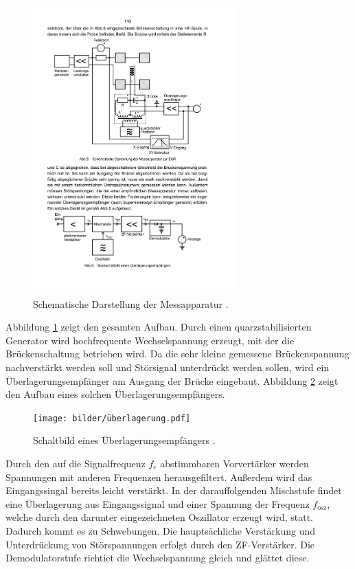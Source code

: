 \begin{figure}
	\centering
  \includegraphics[width=0.7\textwidth] {bilder/aufbau2.pdf}
	\caption{Schematische Darstellung der Messapparatur \cite{anleitung28}.}
	\label{fig:aufbau2}
\end{figure}

Abbildung \ref{fig:aufbau2} zeigt den gesamten Aufbau. Durch einen quarzstabilisierten Generator wird hochfrequente Wechselspannung erzeugt, mit der die Brückenschaltung betrieben wird. Da die sehr kleine gemessene Brückenspannung nachverstärkt werden soll und Störsignal unterdrückt werden sollen, wird ein Überlagerungsempfänger am Ausgang der Brücke eingebaut. Abbildung \ref{fig:ueberlagerung} zeigt den Aufbau eines solchen Überlagerungsempfängers.
\begin{figure}
	\centering
  \texttt{[image: bilder/überlagerung.pdf]}
	\caption{Schaltbild eines Überlagerungsempfängers \cite{anleitung28}.}
	\label{fig:ueberlagerung}
\end{figure}
Durch den auf die Signalfrequenz $f_e$ abstimmbaren Vorvertärker werden Spannungen mit anderen Frequenzen herausgefiltert. Außerdem wird das Eingangssingal bereits leicht verstärkt. In der darauffolgenden Mischstufe findet eine Überlagerung aus Eingangssignal und einer Spannung der Frequenz $f_\mathrm{osz}$, welche durch den darunter eingezeichneten Oszillator erzeugt wird, statt. Dadurch kommt es zu Schwebungen. Die hauptsächliche Verstärkung und Unterdrückung von Störspannungen erfolgt durch den ZF-Verstärker. Die Demodulatorstufe richtiet die Wechselspannung gleich und glättet diese.


